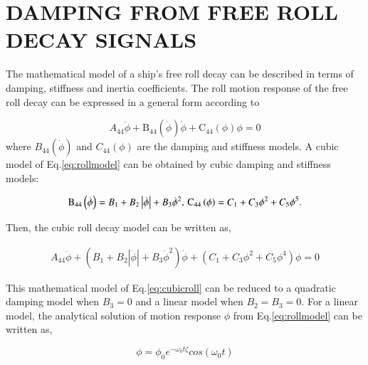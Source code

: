 \section*{DAMPING FROM FREE ROLL DECAY SIGNALS}\label{sec:damping_free_roll_decay}

The mathematical model of a ship's free roll decay can be described in terms of damping, stiffness and inertia coefficients. The roll motion response of the free roll decay can be expressed in a general form according to \citep{7505983/FB64RGPF}

\begin{equation}\label{eq:rollmodel}
A_{44} \ddot{\phi} + \operatorname{B_{44}}\left(\dot{\phi}\right)\dot{\phi} + \operatorname{C_{44}}\left(\phi\right)\phi = 0
\end{equation}
where $B_{44}(\dot{\phi})$ and $C_{44}(\phi)$ are the damping and stiffness models. A cubic model of Eq.\eqref{eq:rollmodel} can be obtained by cubic damping and stiffness models:
 
            
    
\begin{equation}\label{eq:cubicparameters}
\operatorname{B_{44}}\left(\dot{\phi}\right) = B_{1} + B_{2} \left|{\dot{\phi}}\right| + B_{3} \dot{\phi}^{2}, \\
\operatorname{C_{44}}\left(\phi\right) = C_{1} + C_{3} \phi^{2} + C_{5} \phi^{5}.
\end{equation}

Then, the cubic roll decay model can be written as,
            
\begin{equation}\label{eq:cubicroll}
\begin{aligned}
A_{44} \ddot{\phi} + \left(B_{1} + B_{2} \left|{\dot{\phi}}\right| + B_{3} \dot{\phi}^{2}\right) \dot{\phi} + \left(C_{1} + C_{3} \phi^{2} + C_{5} \phi^{4}\right) \phi = 0
\end{aligned}
\end{equation}

This mathematical model of Eq.\eqref{eq:cubicroll} can be reduced to a quadratic damping model when $B_3=0$ and a linear model when $B_2=B_3=0$. For a linear model, the analytical solution of motion response $\phi$ from Eq.\eqref{eq:rollmodel} can be written as,

\begin{equation}\label{eq:analy_motion}
\phi = \phi_0 e^{-\omega_0t\zeta} cos(\omega_{0}t)
\end{equation}

